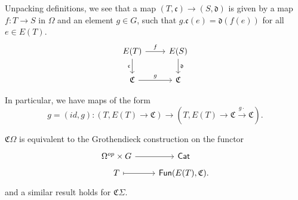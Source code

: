 \documentclass[psamsfonts,onesided,10pt
,draft
]{amsart}%
\begin{document}
\begin{remark}
      Unpacking definitions, we see that a map $(T, \mathfrak c) \to (S, \mathfrak d)$ is given by
      a map $f: T \to S$ in $\Omega$ and an element $g\in G$,
      such that $g.\mathfrak c(e) = \mathfrak d(f(e))$ for all $e \in E(T)$.
      \begin{equation}
            \begin{tikzcd}
                  E(T) \arrow[r, "f"] \arrow[d, "\mathfrak c"']
                  &
                  E(S) \arrow[d, "\mathfrak d"]
                  \\
                  \mathfrak C \arrow[r, "g"]
                  &
                  \mathfrak C
            \end{tikzcd}
      \end{equation}
      
      In particular, we have maps of the form
      \begin{equation}
            g = (id, g): (T, E(T) \to \mathfrak C) \to (T, E(T) \to \mathfrak C \xrightarrow{g \cdot} \mathfrak C). 
      \end{equation}
\end{remark}

\begin{remark}
      $\mathfrak C \Omega$ is equivalent to the
      Grothendieck construction on the functor
      \begin{equation}
            \begin{tikzcd}[row sep = tiny]
                  \Omega^{op} \times G \arrow[r]
                  &
                  \mathsf{Cat}
                  \\
                  T \arrow[r, mapsto]
                  &
                  \Fun(E(T), \mathfrak C).
            \end{tikzcd}
      \end{equation}
      and a similar result holds for $\mathfrak C \Sigma$. 
\end{remark}
\end{document}
